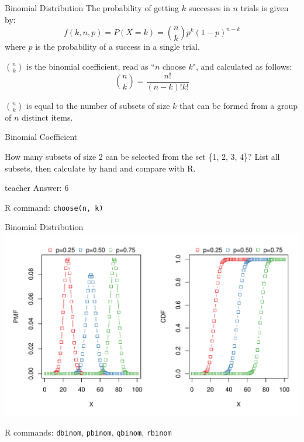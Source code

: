 \begin{frame}{Binomial Distribution}
    The probability of getting $k$ successes in $n$ trials is given by:
    \begin{equation}
    f(k, n, p) = P(X = k) = \binom{n}{k} p^k (1 - p)^{n-k}
    \end{equation}
    where $p$ is the probability of a success in a single trial.
    
    $\binom{n}{k}$ is the binomial coefficient, read as ``$n$ choose $k$", and calculated as follows:
    \begin{equation}
    \binom{n}{k} = \frac{n!}{(n - k)! k!}
    \end{equation}
    
    $\binom{n}{k}$ is equal to the number of subsets of size $k$ that can be formed from a group of $n$ distinct items.
\end{frame}

\begin{frame}{Binomial Coefficient}
    \begin{example}
        \medskip
        How many subsets of size 2 can be selected from the set \{1, 2, 3, 4\}? List all subsets, then calculate by hand and compare with R.
    \end{example}

    \begin{shownto}{teacher}
        Answer: 6
    \end{shownto}

    {\tiny R command: \texttt{choose(n, k)}}
\end{frame}

\begin{frame}{Binomial Distribution}
    \includegraphics[width=\linewidth]{R/plots/binomial-distribution}

    {\tiny R commands: \texttt{dbinom}, \texttt{pbinom}, \texttt{qbinom}, \texttt{rbinom}}
\end{frame}

